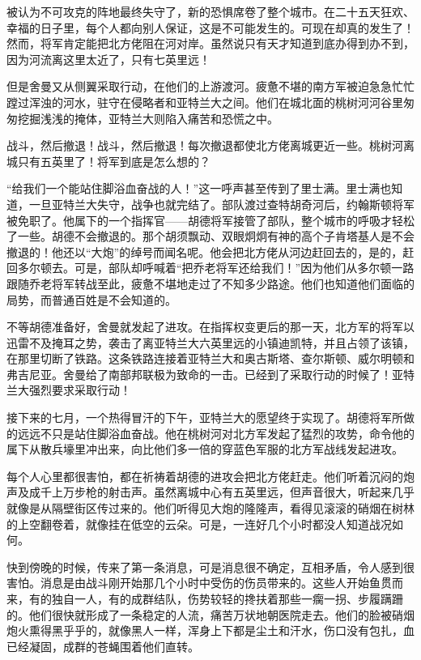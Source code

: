 \par 被认为不可攻克的阵地最终失守了，新的恐惧席卷了整个城市。在二十五天狂欢、幸福的日子里，每个人都向别人保证，这是不可能发生的。可现在却真的发生了！然而，将军肯定能把北方佬阻在河对岸。虽然说只有天才知道到底办得到办不到，因为河流离这里太近了，只有七英里远！
\par 但是舍曼又从侧翼采取行动，在他们的上游渡河。疲惫不堪的南方军被迫急急忙忙蹚过浑浊的河水，驻守在侵略者和亚特兰大之间。他们在城北面的桃树河河谷里匆匆挖掘浅浅的掩体，亚特兰大则陷入痛苦和恐慌之中。
\par 战斗，然后撤退！战斗，然后撤退！每次撤退都使北方佬离城更近一些。桃树河离城只有五英里了！将军到底是怎么想的？
\par “给我们一个能站住脚浴血奋战的人！”这一呼声甚至传到了里士满。里士满也知道，一旦亚特兰大失守，战争也就完结了。部队渡过查特胡奇河后，约翰斯顿将军被免职了。他属下的一个指挥官——胡德将军接管了部队，整个城市的呼吸才轻松了一些。胡德不会撤退的。那个胡须飘动、双眼炯炯有神的高个子肯塔基人是不会撤退的！他还以“大炮”的绰号而闻名呢。他会把北方佬从河边赶回去的，是的，赶回多尔顿去。可是，部队却呼喊着“把乔老将军还给我们！”因为他们从多尔顿一路跟随乔老将军转战至此，疲惫不堪地走过了不知多少路途。他们也知道他们面临的局势，而普通百姓是不会知道的。
\par 不等胡德准备好，舍曼就发起了进攻。在指挥权变更后的那一天，北方军的将军以迅雷不及掩耳之势，袭击了离亚特兰大六英里远的小镇迪凯特，并且占领了该镇，在那里切断了铁路。这条铁路连接着亚特兰大和奥古斯塔、查尔斯顿、威尔明顿和弗吉尼亚。舍曼给了南部邦联极为致命的一击。已经到了采取行动的时候了！亚特兰大强烈要求采取行动！
\par 接下来的七月，一个热得冒汗的下午，亚特兰大的愿望终于实现了。胡德将军所做的远远不只是站住脚浴血奋战。他在桃树河对北方军发起了猛烈的攻势，命令他的属下从散兵壕里冲出来，向比他们多一倍的穿蓝色军服的北方军战线发起进攻。
\par 每个人心里都很害怕，都在祈祷着胡德的进攻会把北方佬赶走。他们听着沉闷的炮声及成千上万步枪的射击声。虽然离城中心有五英里远，但声音很大，听起来几乎就像是从隔壁街区传过来的。他们听得见大炮的隆隆声，看得见滚滚的硝烟在树林的上空翻卷着，就像挂在低空的云朵。可是，一连好几个小时都没人知道战况如何。
\par 快到傍晚的时候，传来了第一条消息，可是消息很不确定，互相矛盾，令人感到很害怕。消息是由战斗刚开始那几个小时中受伤的伤员带来的。这些人开始鱼贯而来，有的独自一人，有的成群结队，伤势较轻的搀扶着那些一瘸一拐、步履蹒跚的。他们很快就形成了一条稳定的人流，痛苦万状地朝医院走去。他们的脸被硝烟炮火熏得黑乎乎的，就像黑人一样，浑身上下都是尘土和汗水，伤口没有包扎，血已经凝固，成群的苍蝇围着他们直转。

